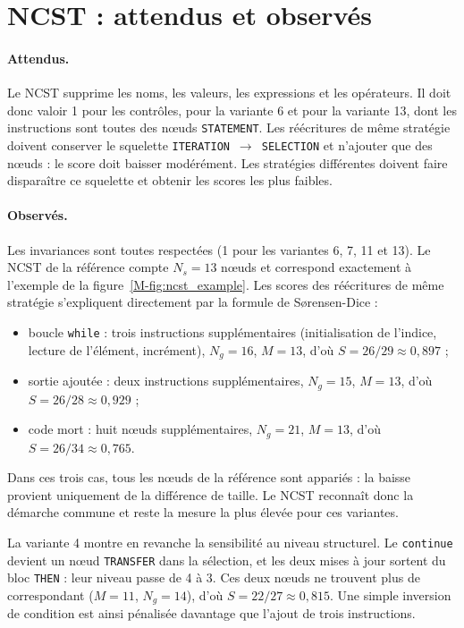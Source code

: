 \documentclass[12pt,a4paper,oneside]{report}
\begin{document}
\section{NCST : attendus et observés}

\paragraph{Attendus.}
Le NCST supprime les noms, les valeurs, les expressions et les opérateurs. Il
doit donc valoir 1 pour les contrôles, pour la variante 6 et pour la
variante 13, dont les instructions sont toutes des nœuds \texttt{STATEMENT}.
Les réécritures de même stratégie doivent conserver le squelette
\texttt{ITERATION}~$\rightarrow$~\texttt{SELECTION} et n'ajouter que des nœuds :
le score doit baisser modérément. Les stratégies différentes doivent faire
disparaître ce squelette et obtenir les scores les plus faibles.

\paragraph{Observés.}
Les invariances sont toutes respectées (1 pour les variantes 6, 7, 11 et 13).
Le NCST de la référence compte $N_s = 13$ nœuds et correspond exactement à
l'exemple de la figure~\ref{M-fig:ncst_example}. Les scores des réécritures de
même stratégie s'expliquent directement par la formule de Sørensen-Dice :
\begin{itemize}
  \item boucle \texttt{while} : trois instructions supplémentaires
        (initialisation de l'indice, lecture de l'élément, incrément),
        $N_g = 16$, $M = 13$, d'où $S = 26/29 \approx 0{,}897$ ;
  \item sortie ajoutée : deux instructions supplémentaires, $N_g = 15$,
        $M = 13$, d'où $S = 26/28 \approx 0{,}929$ ;
  \item code mort : huit nœuds supplémentaires, $N_g = 21$, $M = 13$, d'où
        $S = 26/34 \approx 0{,}765$.
\end{itemize}
Dans ces trois cas, tous les nœuds de la référence sont appariés : la baisse
provient uniquement de la différence de taille. Le NCST reconnaît donc la
démarche commune et reste la mesure la plus élevée pour ces variantes.

La variante 4 montre en revanche la sensibilité au niveau structurel. Le
\texttt{continue} devient un nœud \texttt{TRANSFER} dans la sélection, et les
deux mises à jour sortent du bloc \texttt{THEN} : leur niveau passe de 4 à 3.
Ces deux nœuds ne trouvent plus de correspondant ($M = 11$, $N_g = 14$), d'où
$S = 22/27 \approx 0{,}815$. Une simple inversion de condition est ainsi
pénalisée davantage que l'ajout de trois instructions.
\end{document}
